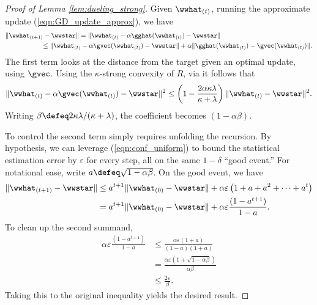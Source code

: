 \documentclass[11pt,oneside]{article}
\theoremstyle{definition} \newtheorem{defn}{Definition}       %
\theoremstyle{plain} \newtheorem{prop}[defn]{Proposition}           %
\theoremstyle{plain} \newtheorem{thm}[defn]{Theorem}                %
\theoremstyle{plain} \newtheorem{lem}[defn]{Lemma}                  %
\theoremstyle{plain} \newtheorem{cor}[defn]{Corollary}              %
\theoremstyle{remark} \newtheorem{rmk}[defn]{Remark}                %
\theoremstyle{remark} \newtheorem{ex}[defn]{Example}                %
\begin{document}
\begin{proof}[Proof of Lemma \ref{lem:dueling_strong}]
Given $\wwhat_{(t)}$, running the approximate update (\ref{eqn:GD_update_approx}), we have
%
\begin{align*}
\|\wwhat_{(t+1)}-\wwstar\| & = \|\wwhat_{(t)}-\alpha\gghat(\wwhat_{(t)})-\wwstar\|\\
& \hspace{-2cm} \leq \|\wwhat_{(t)}-\alpha\gvec(\wwhat_{(t)})-\wwstar\| + \alpha\|\gghat(\wwhat_{(t)})-\gvec(\wwhat_{(t)})\|.
\end{align*}
%
The first term looks at the distance from the target given an optimal update, using $\gvec$. Using the $\kappa$-strong convexity of $R$, via \citet[Thm.~2.1.15]{nesterov2004ConvOpt} it follows that
%
\begin{align*}
\|\wwhat_{(t)}-\alpha\gvec(\wwhat_{(t)})-\wwstar\|^{2} \leq \left(1-\frac{2\alpha\kappa\lambda}{\kappa+\lambda}\right)\|\wwhat_{(t)}-\wwstar\|^{2}.
\end{align*}
%
Writing $\beta \defeq 2\kappa\lambda/(\kappa+\lambda)$, the coefficient becomes $(1-\alpha\beta)$.

To control the second term simply requires unfolding the recursion. By hypothesis, we can leverage (\ref{eqn:conf_uniform}) to bound the statistical estimation error by $\varepsilon$ for every step, all on the same $1-\delta$ ``good event.'' For notational ease, write $a \defeq \sqrt{1-\alpha\beta}$. On the good event, we have
%
\begin{align*}
\|\wwhat_{(t+1)}-\wwstar\| & \leq a^{t+1}\|\wwhat_{(0)}-\wwstar\| + \alpha\varepsilon\left(1+a+a^{2}+\cdots+a^{t}\right)\\
& = a^{t+1}\|\wwhat_{(0)}-\wwstar\| + \alpha\varepsilon\frac{(1-a^{t+1})}{1-a}.
\end{align*}
%
To clean up the second summand,
%
\begin{align*}
\alpha\varepsilon\frac{(1-a^{t+1})}{1-a} & \leq \frac{\alpha\varepsilon(1+a)}{(1-a)(1+a)}\\
& = \frac{\alpha\varepsilon(1+\sqrt{1-\alpha\beta})}{\alpha\beta}\\
& \leq \frac{2\varepsilon}{\beta}.
\end{align*}
%
Taking this to the original inequality yields the desired result.
\end{proof}
\end{document}
